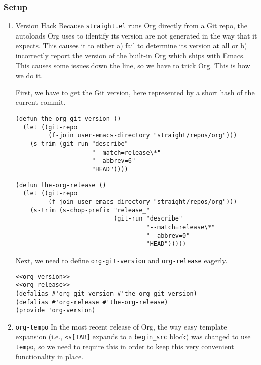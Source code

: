 \documentclass[11pt]{article}
\begin{document}
\subsubsection{Setup}
\label{sec:org5ccedd6}
\begin{enumerate}
\item Version Hack
\label{sec:org199e446}
Because \texttt{straight.el} runs Org directly from a Git repo, the
autoloads Org uses to identify its version are not generated in
the way that it expects. This causes it to either a) fail to
determine its version at all or b) incorrectly report the version
of the built-in Org which ships with Emacs. This causes some
issues down the line, so we have to trick Org. This is how we do it.

First, we have to get the Git version, here represented by a short
hash of the current commit.

\begin{verbatim}
(defun the-org-git-version ()
  (let ((git-repo
         (f-join user-emacs-directory "straight/repos/org")))
    (s-trim (git-run "describe"
                     "--match=release\*"
                     "--abbrev=6"
                     "HEAD"))))
\end{verbatim}

\begin{verbatim}
(defun the-org-release ()
  (let ((git-repo
         (f-join user-emacs-directory "straight/repos/org")))
    (s-trim (s-chop-prefix "release_"
                           (git-run "describe"
                                    "--match=release\*"
                                    "--abbrev=0"
                                    "HEAD")))))
\end{verbatim}

Next, we need to define \texttt{org-git-version} and \texttt{org-release} eagerly.

\begin{verbatim}
<<org-version>>
<<org-release>>
(defalias #'org-git-version #'the-org-git-version)
(defalias #'org-release #'the-org-release)
(provide 'org-version)
\end{verbatim}

\item \texttt{org-tempo}
\label{sec:org334b908}
In the most recent release of Org, the way easy template expansion
(i.e., \texttt{<s[TAB]} expands to a \texttt{begin\_src} block) was changed to use
\texttt{tempo}, so we need to require this in order to keep this very
convenient functionality in place.


\end{enumerate}
\end{document}

